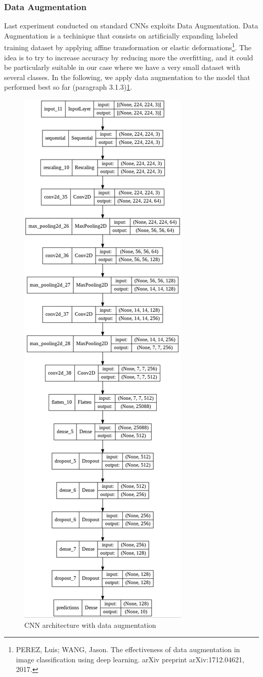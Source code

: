 \subsubsection{Data Augmentation}
Last experiment conducted on standard CNNs exploits Data Augmentation. Data Augmentation is a techinique that consists on artificially expanding labeled training dataset by applying affine transformation or elastic deformations\footnote{PEREZ, Luis; WANG, Jason. The effectiveness of data augmentation in image classification using deep learning. arXiv preprint arXiv:1712.04621, 2017.}. The idea is to try to increase accuracy by reducing more the overfitting, and it could be particularly suitable in our case where we have a very small dataset with several classes. In the following, we apply data augmentation to the model that performed best so far (paragraph 3.1.3)\ref{fig: DataAugmentationStandardCNN}.

\begin{figure}[H]
	\centering
	\includegraphics[height=1.2\textwidth]{img/scratch/DataAugmentedCNN.jpg}
	\caption{CNN architecture with data augmentation}
	\label{fig: DataAugmentationStandardCNN}
\end{figure}

